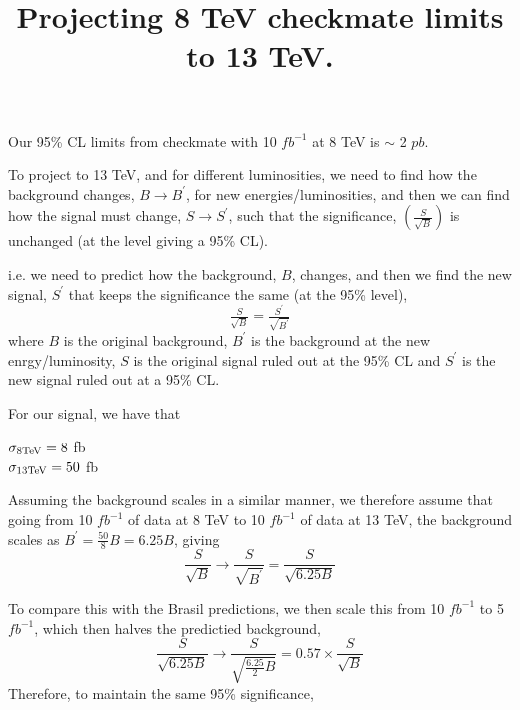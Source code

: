 \documentclass[12pt,a4paper]{article}
\begin{document}
\title{Projecting 8 TeV checkmate limits to 13 TeV.}
\maketitle
Our 95\% CL limits from checkmate with 10 $fb^{-1}$ at 8 TeV is $\sim$ 2 $pb$.

To project to 13 TeV, and for different luminosities, we need to find how the background changes, $B \to B^{\prime}$, for new energies/luminosities, and then we can find how the signal must change, $S \to S^{\prime}$, such that the significance, $\left(\tfrac{S}{\sqrt{B}} \right)$ is unchanged (at the level giving a 95\% CL).

i.e. we need to predict how the background, $B$, changes, and then we find the new signal, $S^{\prime}$ that keeps the significance the same (at the 95\% level),\\
\begin{equation}
  \tfrac{S}{\sqrt{B}} = \tfrac{S^{\prime}}{\sqrt{B^{\prime}}}
\end{equation}
where $B$ is the original background, $B^{\prime}$ is the background at the new enrgy/luminosity, $S$ is the original signal ruled out at the 95\% CL and $S^{\prime}$ is the new signal ruled out at a 95\% CL.

For our signal, we have that 
\begin{center}
$\sigma_{\rm 8 TeV} = 8 $ fb\\
$\sigma_{\rm 13 TeV} = 50$ fb\\
\end{center}

Assuming the background scales in a similar manner, we therefore assume that going from 10 $fb^{-1}$ of data at 8 TeV to 10 $fb^{-1}$ of data at 13 TeV, the background scales as $B^{\prime} = \frac{50}{8} B = 6.25 B$, giving\\
\begin{equation}
  \frac{S}{\sqrt{B}} \to \frac{S}{\sqrt{B^{\prime}}} = \frac{S}{\sqrt{6.25 B}}
\end{equation}

To compare this with the Brasil predictions, we then scale this from 10 $fb^{-1}$ to 5 $fb^{-1}$, which then halves the predictied background,\\
\begin{equation}
  \frac{S}{\sqrt{6.25 B}} \to \frac{S}{\sqrt{\tfrac{6.25}{2}B}} = 0.57 \times \frac{S}{\sqrt{B}}
\end{equation}
Therefore, to maintain the same 95\% significance,
\end{document}

